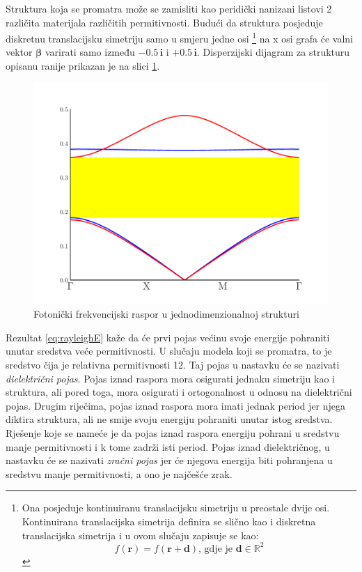 \documentclass[utf8, seminar, numeric]{fer}
\begin{document}
Struktura koja se promatra može se zamisliti kao peridički nanizani listovi 2
različita materijala različitih permitivnosti. Budući da struktura posjeduje
diskretnu translacijsku simetriju samo u smjeru jedne osi
\footnote{
	Ona posjeduje kontinuiranu translacijsku simetriju u preostale dvije osi.
	Kontinuirana translacijska simetrija definira se slično kao i diskretna
	translacijska simetrija i u ovom slučaju zapisuje se kao:
	$$f(\mathbf{r}) = f(\mathbf{r} + \mathbf{d})
	\text{, gdje je }{\mathbf{d} \in \mathbb{R}^2}$$
}
na x osi grafa će valni vektor ${\bm{\beta}}$ varirati samo između
$-0.5 \, \mathbf{i}$ i $+0.5 \, \mathbf{i}$. Disperzijski dijagram za strukturu
opisanu ranije prikazan je na slici \ref{fig:1d_band_diagram}.
\begin{figure}[ht]
	\centering
	\includegraphics[width = 0.8\linewidth]{./images/pdf/1d_crystal_band_gap.pdf}
	\caption{Fotonički frekvencijski raspor u jednodimenzionalnoj strukturi}
	\label{fig:1d_band_diagram}
\end{figure}

Rezultat \ref{eq:rayleighE} kaže da će prvi pojas većinu svoje energije
pohraniti unutar sredstva veće permitivnosti. U slučaju modela koji se
promatra, to je sredstvo čija je relativna permitivnosti 12. Taj pojas
u nastavku će se nazivati \emph{dielektrični pojas}. Pojas iznad raspora mora
osigurati jednaku simetriju kao i struktura, ali pored toga, mora osigurati i
ortogonalnost u odnosu na dielektrični pojas. Drugim riječima, pojas iznad
raspora mora imati jednak period jer njega diktira struktura, ali ne smije svoju
energiju pohraniti unutar istog sredstva. Rješenje koje se nameće je da pojas
iznad raspora energiju pohrani u sredstvu manje permitivnosti i k tome zadrži
isti period. Pojas iznad dielektričnog, u nastavku će se nazivati \emph{zračni
pojas} jer će njegova energija biti pohranjena u sredstvu manje permitivnosti,
a ono je najčešće zrak.
\end{document}
